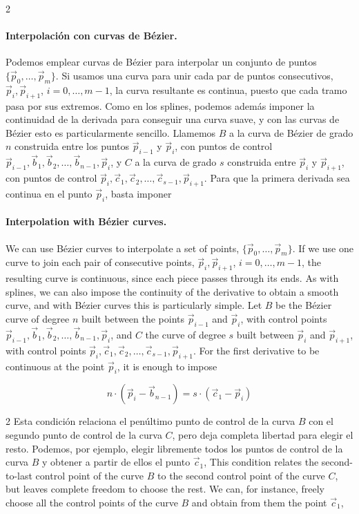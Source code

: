 \begin{paracol}{2}
\paragraph{Interpolación con curvas de Bézier.} Podemos emplear curvas de Bézier para interpolar un conjunto de puntos $\lbrace \vec{p}_0, \dots,  \vec{p}_m\rbrace$. Si usamos una curva para unir cada par de puntos consecutivos, $\vec{p}_i, \vec{p}_{i+1}$, $i =0, \dots, m-1$, la curva resultante es continua, puesto que cada tramo pasa por sus extremos. Como en los splines, podemos además imponer la continuidad de la derivada para conseguir una curva suave, y con las curvas de Bézier esto es particularmente sencillo. Llamemos $B$ a la curva de Bézier de grado $n$ construida entre los puntos $\vec{p}_{i-1}$ y $\vec{p}_{i}$, con puntos de control $\vec{p}_{i-1}, \vec{b}_1, \vec{b}_2,\dots, \vec{b}_{n-1},\vec{p}_{i}$, y $C$ a la curva de grado $s$ construida entre $\vec{p}_{i}$ y $\vec{p}_{i+1}$, con puntos de control $\vec{p}_{i}, \vec{c}_1, \vec{c}_2,\dots, \vec{c}_{s-1},\vec{p}_{i+1}$. Para que la primera derivada sea continua en el punto $\vec{p}_i$, basta imponer
\switchcolumn
\paragraph{Interpolation with Bézier curves.} We can use Bézier curves to interpolate a set of points, $\lbrace \vec{p}_0, \dots,  \vec{p}_m\rbrace$. If we use one curve to join each pair of consecutive points, $\vec{p}_i, \vec{p}_{i+1}$, $i =0, \dots, m-1$, the resulting curve is continuous, since each piece passes through its ends. As with splines, we can also impose the continuity of the derivative to obtain a smooth curve, and with Bézier curves this is particularly simple. Let $B$ be the Bézier curve of degree $n$ built between the points $\vec{p}_{i-1}$ and $\vec{p}_{i}$, with control points $\vec{p}_{i-1}, \vec{b}_1, \vec{b}_2,\dots, \vec{b}_{n-1},\vec{p}_{i}$, and $C$ the curve of degree $s$ built between $\vec{p}_{i}$ and $\vec{p}_{i+1}$, with control points $\vec{p}_{i}, \vec{c}_1, \vec{c}_2,\dots, \vec{c}_{s-1},\vec{p}_{i+1}$. For the first derivative to be continuous at the point $\vec{p}_i$, it is enough to impose
\end{paracol}
\begin{equation*}
n\cdot\left(\vec{p}_i-\vec{b}_{n-1}\right) = s\cdot\left(\vec{c}_1-\vec{p}_i\right)
\end{equation*}
\begin{paracol}{2}
Esta condición relaciona el penúltimo punto de control de la curva $B$ con el segundo punto de control de la curva $C$, pero deja completa libertad para elegir el resto. Podemos, por ejemplo, elegir libremente todos los puntos de control de la curva $B$ y obtener a partir de ellos el punto $\vec{c}_1$,
\switchcolumn
This condition relates the second-to-last control point of the curve $B$ to the second control point of the curve $C$, but leaves complete freedom to choose the rest. We can, for instance, freely choose all the control points of the curve $B$ and obtain from them the point $\vec{c}_1$,
\end{paracol}
